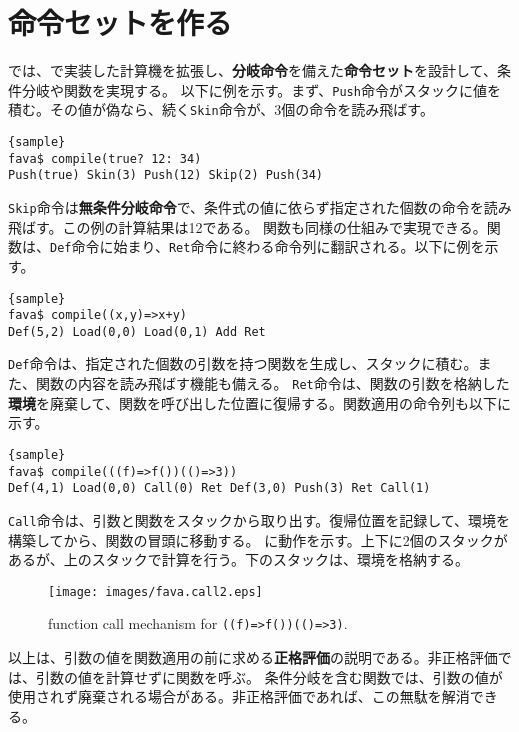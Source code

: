 \documentclass[10pt,a4paper]{book}
\begin{document}
\chapter{命令セットを作る\label{chap:VM}}

では、で実装した計算機を拡張し、\textbf{分岐命令}を備えた\textbf{命令セット}を設計して、条件分岐や関数を実現する。
以下に例を示す。まず、\texttt{Push}命令がスタックに値を積む。その値が偽なら、続く\texttt{Skin}命令が、3個の命令を読み飛ばす。

\begin{Verbatim}{sample}
fava$ compile(true? 12: 34)
Push(true) Skin(3) Push(12) Skip(2) Push(34)
\end{Verbatim}

\texttt{Skip}命令は\textbf{無条件分岐命令}で、条件式の値に依らず指定された個数の命令を読み飛ばす。この例の計算結果は12である。
関数も同様の仕組みで実現できる。関数は、\texttt{Def}命令に始まり、\texttt{Ret}命令に終わる命令列に翻訳される。以下に例を示す。

\begin{Verbatim}{sample}
fava$ compile((x,y)=>x+y)
Def(5,2) Load(0,0) Load(0,1) Add Ret
\end{Verbatim}

\texttt{Def}命令は、指定された個数の引数を持つ関数を生成し、スタックに積む。また、関数の内容を読み飛ばす機能も備える。
\texttt{Ret}命令は、関数の引数を格納した\textbf{環境}を廃棄して、関数を呼び出した位置に復帰する。関数適用の命令列も以下に示す。

\begin{Verbatim}{sample}
fava$ compile(((f)=>f())(()=>3))
Def(4,1) Load(0,0) Call(0) Ret Def(3,0) Push(3) Ret Call(1)
\end{Verbatim}

\texttt{Call}命令は、引数と関数をスタックから取り出す。復帰位置を記録して、環境を構築してから、関数の冒頭に移動する。
に動作を示す。上下に2個のスタックがあるが、上のスタックで計算を行う。下のスタックは、環境を格納する。

\begin{figure}[h]
\centering
\texttt{[image: images/fava.call2.eps]}
\caption{function call mechanism for \texttt{((f)=>f())(()=>3)}.\label{fig:call}}
\end{figure}

以上は、引数の値を関数適用の前に求める\textbf{正格評価}の説明である。非正格評価では、引数の値を計算せずに関数を呼ぶ。
条件分岐を含む関数では、引数の値が使用されず廃棄される場合がある。非正格評価であれば、この無駄を解消できる。
\end{document}
